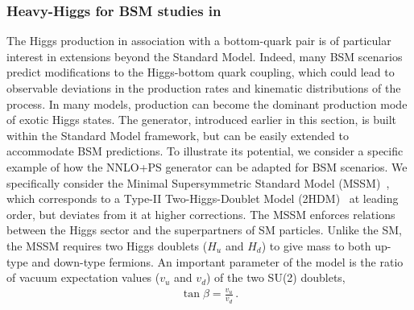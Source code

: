 \documentclass[11pt,a4paper]{article}
\begin{document}
\subsubsection{Heavy-Higgs for BSM studies in \minnlo{}}

The Higgs production in association with a bottom-quark pair is of particular interest in extensions beyond the Standard Model. Indeed, many BSM scenarios predict modifications to the Higgs-bottom quark coupling, which could lead to observable deviations in the production rates and kinematic distributions of the \bbH{} process. In many models, \bbH{} production can become the dominant production mode of exotic Higgs states. The \minnlo{} generator, introduced earlier in this section, is built within the Standard Model framework, but can be easily extended to accommodate BSM predictions. To illustrate its potential, we consider a specific example of how the NNLO+PS generator can be adapted for BSM scenarios. We specifically consider the Minimal Supersymmetric Standard Model (MSSM)~\cite{Fayet:1974pd,Fayet:1976et,Fayet:1977yc,Ovrut:1984uc,Haber:1984rc,Gunion:1984yn}, which corresponds to a Type-II Two-Higgs-Doublet Model (2HDM)~\cite{Branco:2011iw} at leading order, but deviates from it at higher corrections. The MSSM enforces relations between the Higgs sector and the superpartners of SM particles. Unlike the SM, the MSSM requires two Higgs doublets ($H_u$ and $H_d$) to give mass to both up-type and down-type fermions. An important parameter of the model is the ratio of vacuum expectation values ($v_u$ and $v_d$) of the two SU(2) doublets,
\begin{align}
	\tan\beta=\frac{v_u}{v_d}\,.
\end{align}
\end{document}
